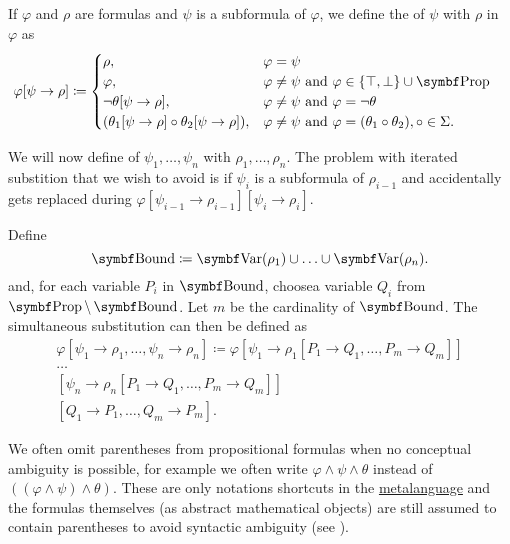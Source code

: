 \begin{definition}\label{def:propositional_substition}
  If \( \varphi \) and \( \rho \) are formulas and \( \psi \) is a subformula of \( \varphi \), we define the  of \( \psi \) with \( \rho \) in \( \varphi \) as
  \begin{align*}
    \varphi[\psi \to \rho] &\coloneqq \begin{cases}
      \rho,                                                    &\varphi = \psi \\
      \varphi,                                                 &\varphi \neq \psi \text{ and } \varphi \in \{ \top, \bot \} \cup \Cat{Prop} \\
      \neg \theta[\psi \to \rho],                              &\varphi \neq \psi \text{ and } \varphi = \neg \theta \\
      (\theta_1[\psi \to \rho] \circ \theta_2[\psi \to \rho]), &\varphi \neq \psi \text{ and } \varphi = (\theta_1 \circ \theta_2), \circ \in \Sigma.
    \end{cases}
  \end{align*}

  We will now define  of \( \psi_1, \ldots, \psi_n \) with \( \rho_1, \ldots, \rho_n \). The problem with iterated substition that we wish to avoid is if \( \psi_i \) is a subformula of \( \rho_{i-1} \) and accidentally gets replaced during \( \varphi[\psi_{i-1} \to \rho_{i-1}][\psi_i \to \rho_i] \).

  Define
  \begin{equation*}
    \Cat{Bound} \coloneqq \Bold{Var}(\rho_1) \cup \ldots \cup \Bold{Var}(\rho_n).
  \end{equation*}
  and, for each variable \( P_i \) in \( \Cat{Bound} \), choose\AOC a variable \( Q_i \) from \( \Bold{Prop} \setminus \Bold{Bound} \). Let \( m \) be the cardinality of \( \Bold{Bound} \). The simultaneous substitution can then be defined as
  \begin{align*}
    \varphi[\psi_1 \to \rho_1, \ldots, \psi_n \to \rho_n] \coloneqq \varphi
    [\psi_1 \to \rho_1[P_1 \to Q_1, \ldots, P_m \to Q_m]] \\
    \ldots \\
    [\psi_n \to \rho_n[P_1 \to Q_1, \ldots, P_m \to Q_m]] \\
    [Q_1 \to P_1, \ldots, Q_m \to P_m].
  \end{align*}
\end{definition}

\begin{remark}\label{remark:propositional_formula_parentheses}
  We often omit parentheses from propositional formulas when no conceptual ambiguity is possible, for example we often write \( \varphi \land \psi \land \theta \) instead of \( ((\varphi \land \psi) \land \theta) \). These are only notations shortcuts in the \hyperref[remark:metalanguage]{metalanguage} and the formulas themselves (as abstract mathematical objects) are still assumed to contain parentheses to avoid syntactic ambiguity (see ).
\end{remark}

